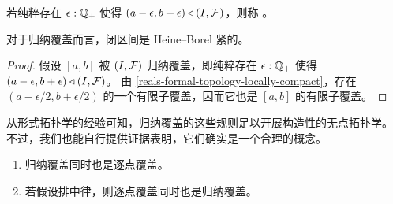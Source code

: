 若纯粹存在 $\epsilon : \mathbb{Q}_{+}$ 使得 $(a - \epsilon, b +
\epsilon) \triangleleft {\mathopen{}(I, \mathcal{F})\mathclose{}}$，则称 。

\begin{cor} \label{interval-Heine-Borel}
  对于归纳覆盖而言，闭区间是 Heine--Borel 紧的。
\end{cor}

\begin{proof}
  假设 $[a, b]$ 被 ${\mathopen{}(I, \mathcal{F})\mathclose{}}$ 归纳覆盖，即纯粹存在 $\epsilon : \mathbb{Q}_{+}$ 使得 $(a - \epsilon, b + \epsilon) \triangleleft {\mathopen{}(I, \mathcal{F})\mathclose{}}$。
  由 \cref{reals-formal-topology-locally-compact}，存在
  $(a - \epsilon/2, b + \epsilon/2)$ 的一个有限子覆盖，因而它也是 $[a, b]$ 的有限子覆盖。
\end{proof}

从形式拓扑学的经验可知，归纳覆盖的这些规则足以开展构造性的无点拓扑学。
不过，我们也能自行提供证据表明，它们确实是一个合理的概念。

\begin{thm} \label{inductive-cover-classical}
  \mbox{}
  \begin{enumerate}
  \item 归纳覆盖同时也是逐点覆盖。
  \item 若假设排中律，则逐点覆盖同时也是归纳覆盖。
  \end{enumerate}
\end{thm}

